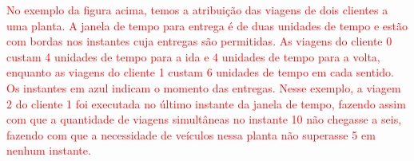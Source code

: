  \textcolor{red}{No exemplo da figura acima, temos a atribuição das viagens de dois clientes a uma planta. A janela de tempo para entrega é de duas unidades de tempo e estão com bordas nos instantes cuja entregas são permitidas. As viagens do cliente 0 custam 4 unidades de tempo para a ida e 4 unidades de tempo para a volta, enquanto as viagens do cliente 1 custam 6 unidades de tempo em cada sentido. Os instantes em azul indicam o momento das entregas.
Nesse exemplo, a viagem 2 do cliente 1 foi executada no último instante da janela de tempo, fazendo assim com que a quantidade de viagens simultâneas no instante 10 não chegasse a seis, fazendo com que a necessidade de veículos nessa planta não superasse 5 em nenhum instante. }